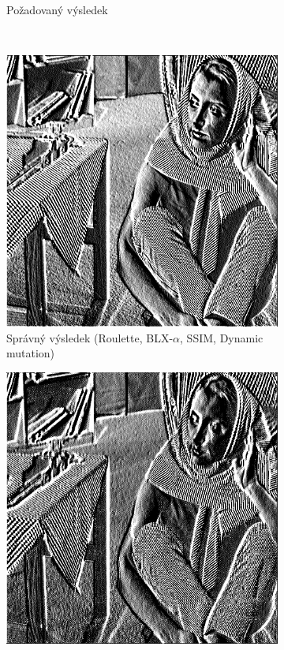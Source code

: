 \documentclass[a4paper,11pt,titlepage]{scrartcl}
\begin{document}
\begin{figure}[!h]
\begin{subfigure}[b]{0.40\textwidth}
        \caption{Požadovaný výsledek}
        \label{fig:gull}
    \end{subfigure}
    \\
    \begin{subfigure}[b]{0.32\textwidth}
        \includegraphics[width=\textwidth]{img/roulette-blx_a-ssim-dynamic_example6.jpg}
        \caption{Správný výsledek (Roulette, BLX-$\alpha$, SSIM, Dynamic mutation)}
        \label{fig:ex61}
    \end{subfigure}
    \begin{subfigure}[b]{0.32\textwidth}
        \includegraphics[width=\textwidth]{img/ranksel-simple-mse-swap_example6.jpg}

\end{subfigure}
\end{figure}
\end{document}
